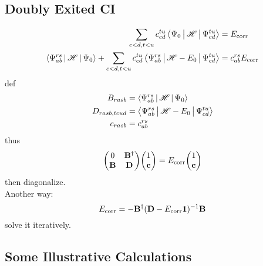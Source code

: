 \documentclass[a4paper]{article}
\newcommand{\iden}{{\large \bm{1}}}
\DeclareMathOperator{\corr}{\mathrm{corr}}
\numberwithin{equation}{section}
\begin{document}
\subsection{Doubly Exited CI}
\begin{align}
\sum_{c<d,t<u} c_{cd}^{tu} \Braket{\Psi_0 | \mathscr{H} | \Psi_{cd}^{tu}} &= E_{\corr} \\
\Braket{\Psi_{ab}^{rs} | \mathscr{H} | \Psi_0} + \sum_{c<d,t<u} c_{cd}^{tu} \Braket{\Psi_{ab}^{rs} | \mathscr{H} - E_0 | \Psi_{cd}^{tu}} &= c_{ab}^{rs} E_{\corr} 
\end{align}
def
\begin{align}
B_{rasb} &= \Braket{\Psi_{ab}^{rs} | \mathscr{H} | \Psi_0} \\
D_{rasb,tcud} &= \Braket{\Psi_{ab}^{rs} | \mathscr{H} - E_0 | \Psi_{cd}^{tu}} \\
c_{rasb} &= c_{ab}^{rs}
\end{align}
thus
\begin{equation}\label{key}
\mqty(0 & \vb{B}^\dagger\\ \vb{B} & \vb{D})\mqty(1\\ \vb{c}) = E_{\corr} \mqty(1\\ \vb{c})
\end{equation}
then diagonalize.\\
Another way:
\begin{equation}\label{key}
E_{\corr} = -\vb{B}^\dagger (\vb{D} - E_{\corr}\iden)^{-1} \vb{B}
\end{equation}
solve it iteratively.

\subsection{Some Illustrative Calculations}
\end{document}
